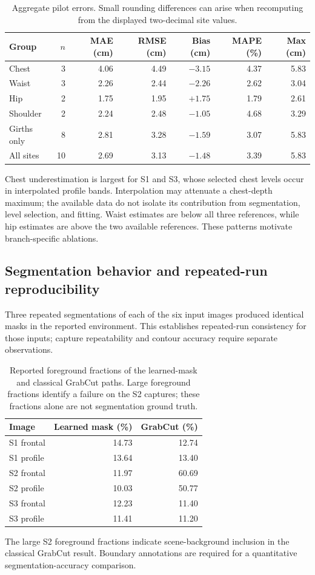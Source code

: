 \documentclass[11pt,a4paper]{article}
\numberwithin{equation}{section}
\begin{document}
\begin{table}[htbp]
\centering\small
\caption{Aggregate pilot errors. Small rounding differences can arise when recomputing from the displayed two-decimal site values.}
\label{tab:aggregate_error}
\begin{tabular}{lrrrrrr}
\toprule
Group & $n$ & MAE (cm) & RMSE (cm) & Bias (cm) & MAPE (\%) & Max (cm) \\
\midrule
Chest & 3 & 4.06 & 4.49 & $-3.15$ & 4.37 & 5.83 \\
Waist & 3 & 2.26 & 2.44 & $-2.26$ & 2.62 & 3.04 \\
Hip & 2 & 1.75 & 1.95 & $+1.75$ & 1.79 & 2.61 \\
Shoulder & 2 & 2.24 & 2.48 & $-1.05$ & 4.68 & 3.29 \\
Girths only & 8 & 2.81 & 3.28 & $-1.59$ & 3.07 & 5.83 \\
All sites & 10 & 2.69 & 3.13 & $-1.48$ & 3.39 & 5.83 \\
\bottomrule
\end{tabular}
\end{table}

Chest underestimation is largest for S1 and S3, whose selected chest levels occur in interpolated profile bands. Interpolation may attenuate a chest-depth maximum; the available data do not isolate its contribution from segmentation, level selection, and fitting. Waist estimates are below all three references, while hip estimates are above the two available references. These patterns motivate branch-specific ablations.

\subsection{Segmentation behavior and repeated-run reproducibility}
Three repeated segmentations of each of the six input images produced identical masks in the reported environment. This establishes repeated-run consistency for those inputs; capture repeatability and contour accuracy require separate observations.

\begin{table}[htbp]
\centering\small
\caption{Reported foreground fractions of the learned-mask and classical GrabCut paths. Large foreground fractions identify a failure on the S2 captures; these fractions alone are not segmentation ground truth.}
\label{tab:segmentation_comparison}
\begin{tabular}{lrr}
\toprule
Image & Learned mask (\%) & GrabCut (\%) \\
\midrule
S1 frontal & 14.73 & 12.74 \\
S1 profile & 13.64 & 13.40 \\
S2 frontal & 11.97 & 60.69 \\
S2 profile & 10.03 & 50.77 \\
S3 frontal & 12.23 & 11.40 \\
S3 profile & 11.41 & 11.20 \\
\bottomrule
\end{tabular}
\end{table}
The large S2 foreground fractions indicate scene-background inclusion in the classical GrabCut result. Boundary annotations are required for a quantitative segmentation-accuracy comparison.
\end{document}
